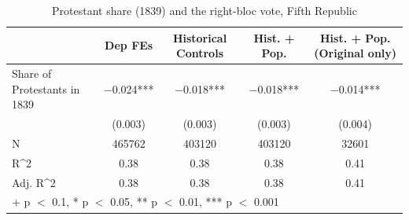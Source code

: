 \begin{table}
\centering
\caption{Protestant share (1839) and the right-bloc vote, Fifth Republic}
\centering
\begin{tabular}[t]{lcccc}
\toprule
  & Dep FEs & Historical Controls & Hist. + Pop. & Hist. + Pop. (Original only)\\
\midrule
Share of Protestants in 1839 & \num{-0.024}*** & \num{-0.018}*** & \num{-0.018}*** & \num{-0.014}***\\
 & (\num{0.003}) & (\num{0.003}) & (\num{0.003}) & (\num{0.004})\\
\midrule
N & \num{465762} & \num{403120} & \num{403120} & \num{32601}\\
R\textasciicircum{}2 & \num{0.38} & \num{0.38} & \num{0.38} & \num{0.41}\\
Adj. R\textasciicircum{}2 & \num{0.38} & \num{0.38} & \num{0.38} & \num{0.41}\\
\bottomrule
\multicolumn{5}{l}{\rule{0pt}{1em}+ p $<$ 0.1, * p $<$ 0.05, ** p $<$ 0.01, *** p $<$ 0.001}\\
\end{tabular}
\end{table}

